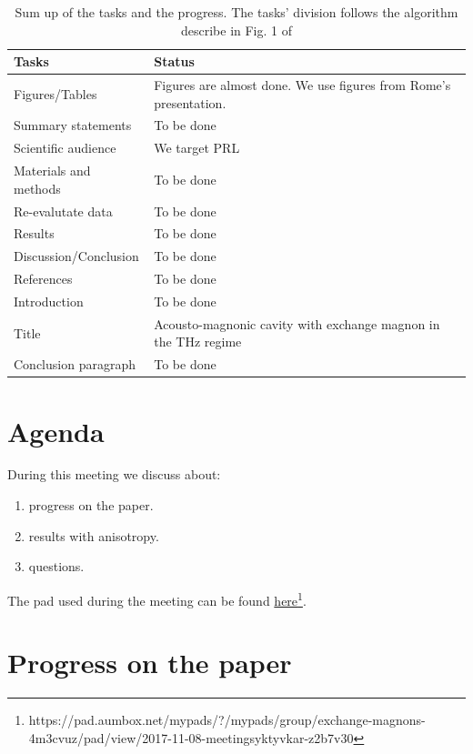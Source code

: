 \documentclass[12pt,a4paper]{article}
\begin{document}
\begin{table}[ht]
    \centering
    \begin{tabular}{|l|l|}
    \hline
    Tasks & Status \\
    \hline
    \hline
    Figures/Tables & Figures are almost done. We use figures from Rome's presentation. \\
    \hline
    Summary statements & To be done\\
    \hline
    Scientific audience & We target PRL\\
    \hline
    Materials and methods & To be done\\
    \hline
    Re-evalutate data & To be done\\
    \hline
    Results & To be done\\
    \hline
    Discussion/Conclusion & To be done\\
    \hline
    References & To be done\\
    \hline
    Introduction & To be done\\
    \hline
    Title & Acousto-magnonic cavity with exchange magnon in the THz regime\\
    \hline
    Conclusion paragraph & To be done \\
    \hline
    \end{tabular}
    \caption{Sum up of the tasks and the progress. The tasks' division follows the algorithm describe in Fig. 1 of \cite{o2009algorithm}}
    \label{tab:my_label}
\end{table}

\section*{Agenda}

During this meeting we discuss about:
\begin{enumerate}
    \item progress on the paper.
    \item results with anisotropy.
    \item questions.
\end{enumerate}

The pad used during the meeting can be found \href{https://pad.aumbox.net/mypads/?/mypads/group/exchange-magnons-4m3cvuz/pad/view/2017-11-08-meetingsyktyvkar-z2b7v30}{here}\footnote{https://pad.aumbox.net/mypads/?/mypads/group/exchange-magnons-4m3cvuz/pad/view/2017-11-08-meetingsyktyvkar-z2b7v30}.

\section{Progress on the paper}
\end{document}
